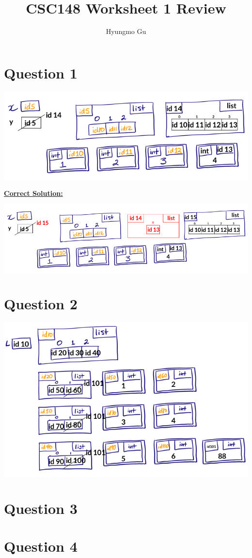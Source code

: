 \documentclass[12pt]{article}
\begin{document}
\title{CSC148 Worksheet 1 Review}
\author{Hyungmo Gu}
\maketitle

\section*{Question 1}
\begin{center}
\includegraphics[width=0.8\linewidth]{images/worksheet_1_review_q1_solution.png}
\end{center}

\bigskip

\begin{mdframed}
    \underline{\textbf{Correct Solution:}}

    \bigskip

    \begin{center}
    \includegraphics[width=0.8 \linewidth]{images/worksheet_1_review_q1_correction.png}
    \end{center}

\end{mdframed}

\section*{Question 2}
\begin{center}
\includegraphics[width=0.8\linewidth]{images/worksheet_1_review_q2_solution.png}
\end{center}

\section*{Question 3}

\section*{Question 4}
\end{document}
